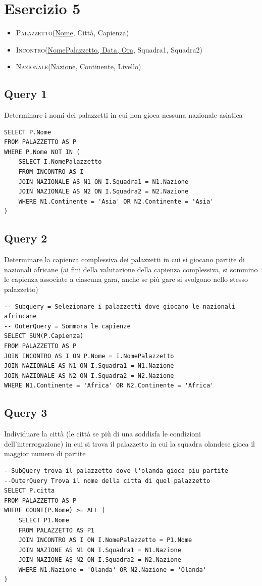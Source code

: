 \newpage
\section{Esercizio 5}
\begin{itemize}
    \item \textsc{Palazzetto}(\underline{Nome}, Città, Capienza)
    \item \textsc{Incontro}(\underline{NomePalazzetto, Data, Ora}, Squadra1, Squadra2)
    \item \textsc{Nazionale}(\underline{Nazione}, Continente, Livello).
\end{itemize}

\subsection{Query 1}
Determinare i nomi dei palazzetti in cui non gioca nessuna nazionale asiatica
\begin{lstlisting}
SELECT P.Nome
FROM PALAZZETTO AS P
WHERE P.Nome NOT IN (
    SELECT I.NomePalazzetto
    FROM INCONTRO AS I
    JOIN NAZIONALE AS N1 ON I.Squadra1 = N1.Nazione
    JOIN NAZIONALE AS N2 ON I.Squadra2 = N2.Nazione
    WHERE N1.Continente = 'Asia' OR N2.Continente = 'Asia'
)
\end{lstlisting}


\subsection{Query 2}
Determinare la capienza complessiva dei palazzetti in cui si giocano partite di nazionali africane (ai fini della valutazione della capienza complessiva, si sommino le capienza associate a ciascuna gara, anche se più gare si svolgono nello stesso palazzetto)

\begin{lstlisting}
-- Subquery = Selezionare i palazzetti dove giocano le nazionali afrincane
-- OuterQuery = Sommora le capienze
SELECT SUM(P.Capienza)
FROM PALAZZETTO AS P
JOIN INCONTRO AS I ON P.Nome = I.NomePalazzetto
JOIN NAZIONALE AS N1 ON I.Squadra1 = N1.Nazione
JOIN NAZIONALE AS N2 ON I.Squadra2 = N2.Nazione
WHERE N1.Continente = 'Africa' OR N2.Continente = 'Africa'
\end{lstlisting}

\subsection{Query 3}
Individuare la città (le città se più di una soddisfa le condizioni dell'interrogazione) in cui si trova il palazzetto in cui la squadra olandese gioca il maggior numero di partite
\begin{lstlisting}
--SubQuery trova il palazzetto dove l'olanda gioca piu partite
--OuterQuery Trova il nome della citta di quel palazzetto
SELECT P.citta
FROM PALAZZETTO AS P
WHERE COUNT(P.Nome) >= ALL (
    SELECT P1.Nome
    FROM PALAZZETTO AS P1
    JOIN INCONTRO AS I ON I.NomePalazzetto = P1.Nome
    JOIN NAZIONE AS N1 ON I.Squadra1 = N1.Nazione
    JOIN NAZIONE AS N2 ON I.Squadra2 = N2.Nazione
    WHERE N1.Nazione = 'Olanda' OR N2.Nazione = 'Olanda'
)
\end{lstlisting}


